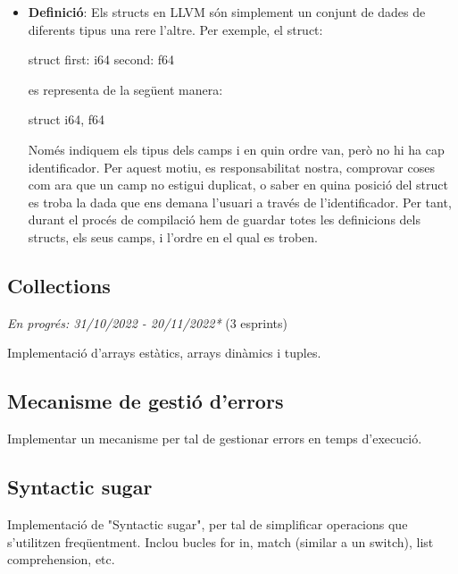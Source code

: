 ﻿\documentclass{article}
\begin{document}
       \begin{itemize}
        \item \textbf{Definició}: Els structs en LLVM són simplement un conjunt
            de dades de diferents tipus una rere l'altre. Per exemple, el struct:

            \begin{code}
                struct {
                    first: i64
                    second: f64
                }
            \end{code}

            es representa de la següent manera:

            \begin{code}
                struct { i64, f64 }
            \end{code}

            Només indiquem els tipus dels camps i en quin ordre van, però no hi
            ha cap identificador. Per aquest motiu, es responsabilitat nostra,
            comprovar coses com ara que un camp no estigui duplicat, o saber en
            quina posició del struct es troba la dada que ens demana l'usuari a
            través de l'identificador. Per tant, durant el procés de compilació
            hem de guardar totes les definicions dels structs, els seus camps, i
            l'ordre en el qual es troben.
       \end{itemize}

    \subsection{Collections}
        \textit{En progrés: 31/10/2022 - 20/11/2022*} (3 esprints)

        Implementació d'arrays estàtics, arrays dinàmics i tuples.

    \subsection{Mecanisme de gestió d'errors}
        Implementar un mecanisme per tal de gestionar errors en temps d'execució.

    \subsection{Syntactic sugar}
        Implementació de "Syntactic sugar", per tal de simplificar operacions
        que s'utilitzen freqüentment. Inclou bucles for in, match (similar a un
        switch), list comprehension, etc.
\end{document}
